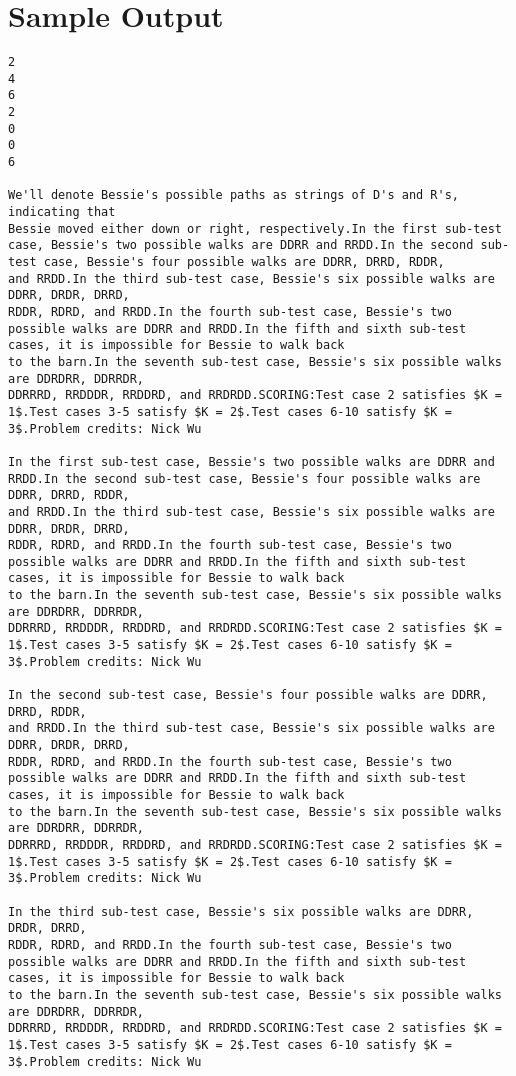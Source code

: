 \documentclass[12pt]{article}
\begin{document}
\section*{Sample Output}
\begin{verbatim}
2
4
6
2
0
0
6

We'll denote Bessie's possible paths as strings of D's and R's, indicating that
Bessie moved either down or right, respectively.In the first sub-test case, Bessie's two possible walks are DDRR and RRDD.In the second sub-test case, Bessie's four possible walks are DDRR, DRRD, RDDR,
and RRDD.In the third sub-test case, Bessie's six possible walks are DDRR, DRDR, DRRD,
RDDR, RDRD, and RRDD.In the fourth sub-test case, Bessie's two possible walks are DDRR and RRDD.In the fifth and sixth sub-test cases, it is impossible for Bessie to walk back
to the barn.In the seventh sub-test case, Bessie's six possible walks are DDRDRR, DDRRDR,
DDRRRD, RRDDDR, RRDDRD, and RRDRDD.SCORING:Test case 2 satisfies $K = 1$.Test cases 3-5 satisfy $K = 2$.Test cases 6-10 satisfy $K = 3$.Problem credits: Nick Wu

In the first sub-test case, Bessie's two possible walks are DDRR and RRDD.In the second sub-test case, Bessie's four possible walks are DDRR, DRRD, RDDR,
and RRDD.In the third sub-test case, Bessie's six possible walks are DDRR, DRDR, DRRD,
RDDR, RDRD, and RRDD.In the fourth sub-test case, Bessie's two possible walks are DDRR and RRDD.In the fifth and sixth sub-test cases, it is impossible for Bessie to walk back
to the barn.In the seventh sub-test case, Bessie's six possible walks are DDRDRR, DDRRDR,
DDRRRD, RRDDDR, RRDDRD, and RRDRDD.SCORING:Test case 2 satisfies $K = 1$.Test cases 3-5 satisfy $K = 2$.Test cases 6-10 satisfy $K = 3$.Problem credits: Nick Wu

In the second sub-test case, Bessie's four possible walks are DDRR, DRRD, RDDR,
and RRDD.In the third sub-test case, Bessie's six possible walks are DDRR, DRDR, DRRD,
RDDR, RDRD, and RRDD.In the fourth sub-test case, Bessie's two possible walks are DDRR and RRDD.In the fifth and sixth sub-test cases, it is impossible for Bessie to walk back
to the barn.In the seventh sub-test case, Bessie's six possible walks are DDRDRR, DDRRDR,
DDRRRD, RRDDDR, RRDDRD, and RRDRDD.SCORING:Test case 2 satisfies $K = 1$.Test cases 3-5 satisfy $K = 2$.Test cases 6-10 satisfy $K = 3$.Problem credits: Nick Wu

In the third sub-test case, Bessie's six possible walks are DDRR, DRDR, DRRD,
RDDR, RDRD, and RRDD.In the fourth sub-test case, Bessie's two possible walks are DDRR and RRDD.In the fifth and sixth sub-test cases, it is impossible for Bessie to walk back
to the barn.In the seventh sub-test case, Bessie's six possible walks are DDRDRR, DDRRDR,
DDRRRD, RRDDDR, RRDDRD, and RRDRDD.SCORING:Test case 2 satisfies $K = 1$.Test cases 3-5 satisfy $K = 2$.Test cases 6-10 satisfy $K = 3$.Problem credits: Nick Wu


\end{verbatim}
\end{document}

